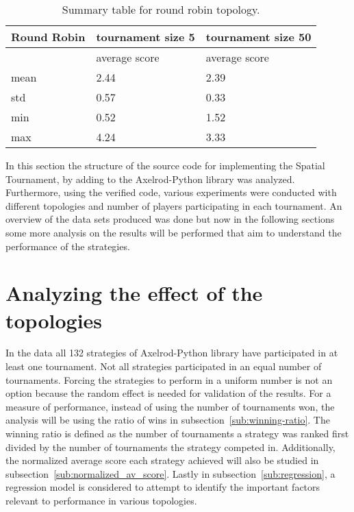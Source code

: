 \begin{table}[H]
	\centering
	\begin{adjustbox}{width=0.5\textwidth}
		\small
	\begin{tabular}{|l|l|l|}
		\hline
		Round Robin & \multicolumn{1}{c|}{tournament size 5} & \multicolumn{1}{c|}{tournament size 50} \\ \hline

		            & average score                          & average score                           \\ \hline
		mean        & 2.44                                   & 2.39                                    \\ \hline
		std         & 0.57                                   & 0.33                                    \\ \hline
		min         & 0.52                                   & 1.52                                    \\ \hline
		max         & 4.24                                   & 3.33                                    \\ \hline
	\end{tabular}
\end{adjustbox}
	\caption{Summary table for round robin topology.}
	\label{sum-rr}
\end{table}

In this section the structure of the source code for implementing the Spatial
Tournament, by adding to the Axelrod-Python library was analyzed. Furthermore,
using the verified code, various experiments were conducted with different
topologies
and number of players participating in each tournament. An overview of the
data sets produced was done but now in the following sections
some more analysis on the results will be performed that aim to understand
the performance of the strategies.

\section{Analyzing the effect of the topologies}
\label{sub:analyzing_the_effect_of_the_topologies}
In the data all 132 strategies of Axelrod-Python library have participated in at
least one tournament. Not all strategies participated in an equal number of tournaments.
Forcing the strategies to perform in a uniform number is
not an option because the random effect is needed for validation of the
results. For a measure of
performance, instead of using the number of tournaments won, the analysis will
be using the ratio of wins in subsection~\ref{sub:winning-ratio}.
The winning ratio is defined as the number of tournaments a strategy was ranked
first divided by the number of tournaments the strategy competed in.
Additionally, the normalized average score each strategy
achieved will also be studied in subsection~\ref{sub:normalized_av_score}.
Lastly in subsection~\ref{sub:regression}, a regression model is considered to
attempt to identify the important factors relevant to performance in various
topologies.

